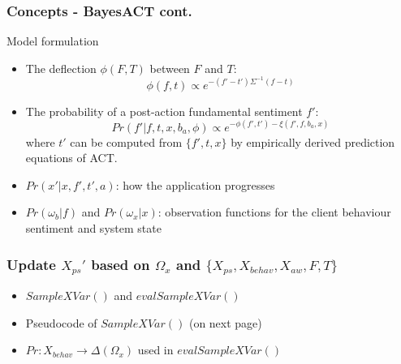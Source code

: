 \documentclass{beamer}
\begin{document}
\begin{frame}
\frametitle{Concepts - BayesACT cont.}
Model formulation
\begin{itemize}
\item The deflection $\phi(F, T)$ between $F$ and $T$: 
\begin{equation}\label{eq:eq_deflection}
\phi(f,t) \propto e^{-(f'-t')\Sigma^{-1}(f-t)}
\end{equation}
\item The probability of a post-action fundamental sentiment $f'$:
\begin{equation}\label{eq:eq_pr_f}
Pr(f'|f,t,x,b_{a},\phi) \propto e^{-\phi(f',t')-\xi(f',f,b_{a},x)} 
\end{equation}
where $t'$ can be computed from $\{f', t, x\}$ by empirically derived prediction equations of ACT.
\item $Pr(x'|x,f',t',a)$: how the application progresses
\item $Pr(\omega_{b}|f)$ and $Pr(\omega_{x}|x)$: observation functions for the client behaviour sentiment and system state 
\end{itemize}
\end{frame}

\begin{frame}
\frametitle{Update $X_{ps}'$ based on $\Omega_{x}$ and $\{X_{ps}, X_{behav}, X_{aw}, F, T\}$}
\begin{itemize}
\item $SampleXVar()$ and $evalSampleXVar()$
\item Pseudocode of $SampleXVar()$ (on next page)
\item $Pr: X_{behav} \to \Delta(\Omega_{x})$ used in $evalSampleXVar()$
\end{itemize}
\end{frame}
\end{document}
